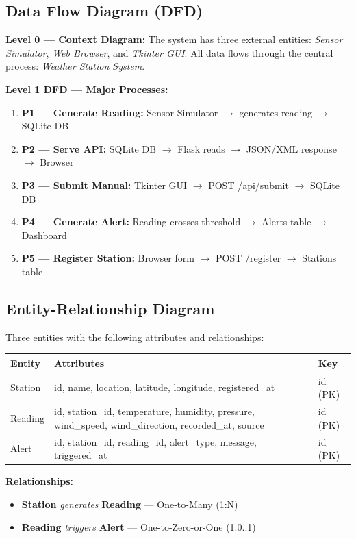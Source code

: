 \documentclass[12pt,a4paper]{article}
\begin{document}
\subsection{Data Flow Diagram (DFD)}
\textbf{Level 0 — Context Diagram:}
The system has three external entities: \textit{Sensor Simulator}, \textit{Web Browser}, and \textit{Tkinter GUI}. All data flows through the central process: \textit{Weather Station System}.

\textbf{Level 1 DFD — Major Processes:}
\begin{enumerate}
  \item \textbf{P1 — Generate Reading:} Sensor Simulator $\rightarrow$ generates reading $\rightarrow$ SQLite DB
  \item \textbf{P2 — Serve API:} SQLite DB $\rightarrow$ Flask reads $\rightarrow$ JSON/XML response $\rightarrow$ Browser
  \item \textbf{P3 — Submit Manual:} Tkinter GUI $\rightarrow$ POST /api/submit $\rightarrow$ SQLite DB
  \item \textbf{P4 — Generate Alert:} Reading crosses threshold $\rightarrow$ Alerts table $\rightarrow$ Dashboard
  \item \textbf{P5 — Register Station:} Browser form $\rightarrow$ POST /register $\rightarrow$ Stations table
\end{enumerate}

\subsection{Entity-Relationship Diagram}
Three entities with the following attributes and relationships:

\begin{center}
\begin{tabular}{lll}
\toprule
\textbf{Entity} & \textbf{Attributes} & \textbf{Key} \\
\midrule
Station & id, name, location, latitude, longitude, registered\_at & id (PK) \\
Reading & id, station\_id, temperature, humidity, pressure, wind\_speed, wind\_direction, recorded\_at, source & id (PK) \\
Alert   & id, station\_id, reading\_id, alert\_type, message, triggered\_at & id (PK) \\
\bottomrule
\end{tabular}
\end{center}

\textbf{Relationships:}
\begin{itemize}
  \item \textbf{Station} \textit{generates} \textbf{Reading} — One-to-Many (1:N)
  \item \textbf{Reading} \textit{triggers} \textbf{Alert} — One-to-Zero-or-One (1:0..1)
\end{itemize}
\end{document}
